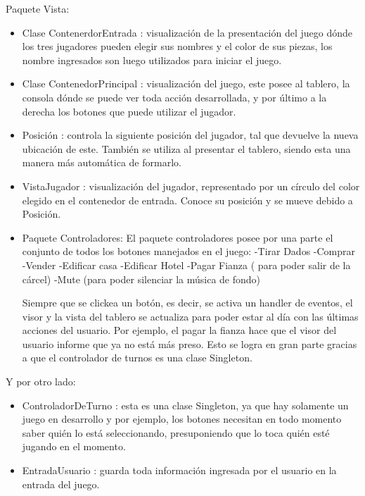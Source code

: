 \documentclass[titlepage,a4paper]{article}
\begin{document}
Paquete Vista: 
\begin{itemize}
\item 
Clase ContenerdorEntrada :  visualización de la presentación del juego dónde los tres jugadores pueden elegir sus nombres y el color de sus piezas, los nombre ingresados son luego utilizados para iniciar el juego.
\end{itemize}
\begin{itemize}
\item 
Clase ContenedorPrincipal : visualización del juego, este posee al tablero, la consola dónde se puede ver toda acción desarrollada, y por último a la derecha los botones que puede utilizar el jugador.
\end{itemize}
\begin{itemize}
\item 
Posición : controla la siguiente posición del jugador, tal que devuelve la nueva ubicación de este. También se utiliza al presentar el tablero, siendo esta una manera más automática de formarlo.
\end{itemize}
\begin{itemize}
\item 
VistaJugador : visualización del jugador, representado por un círculo del color elegido en el contenedor de entrada. Conoce su posición y se mueve debido a Posición.
\end{itemize}
\begin{itemize}
\item 
Paquete Controladores: 
El paquete controladores posee por una parte el conjunto de todos los botones manejados en el juego:
-Tirar Dados
-Comprar
-Vender
-Edificar casa
-Edificar Hotel
-Pagar Fianza ( para poder salir de la cárcel)
-Mute (para poder silenciar la música de fondo)

Siempre que se clickea un botón, es decir, se activa un handler de eventos, el visor y la vista del tablero se actualiza para poder estar al día con las últimas acciones del usuario. Por ejemplo, el pagar la fianza hace que el visor del usuario informe que ya no está más preso. Esto se logra en gran parte gracias a que el controlador de turnos es una clase Singleton.
 \end{itemize}
Y por otro lado:
\begin{itemize}
\item
ControladorDeTurno : esta es una clase Singleton, ya que hay solamente un juego en desarrollo y por ejemplo, los botones necesitan en todo momento saber quién lo está seleccionando, presuponiendo que lo toca quién esté jugando en el momento.
\end{itemize}
\begin{itemize}
\item 
EntradaUsuario : guarda toda información ingresada por el usuario en la entrada del juego.
\end{itemize}
\end{document}
